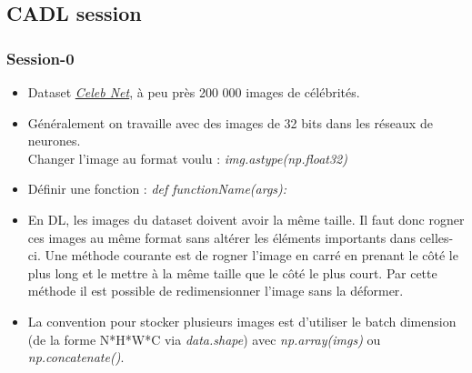 \documentclass[12pt,a4paper]{article}
\begin{document}
\subsection{CADL session}
\subsubsection{Session-0}
\begin{itemize}
\item Dataset \href{http://mmlab.ie.cuhk.edu.hk/projects/CelebA.html}{\textit{Celeb Net}}, à peu près 200 000 images de célébrités.
\item Généralement on travaille avec des images de 32 bits dans les réseaux de neurones.\\
Changer l'image au format voulu : \textit{img.astype(np.float32)}
\item Définir une fonction : \textit{def functionName(args):}
\item En DL, les images du dataset doivent avoir la même taille. Il faut donc rogner ces images au même format sans altérer les éléments importants dans celles-ci. Une méthode courante est de rogner l'image en carré en prenant le côté le plus long et le mettre à la même taille que le côté le plus court. Par cette méthode il est possible de redimensionner l'image sans la déformer.
\item La convention pour stocker plusieurs images est d'utiliser le batch dimension (de la forme N*H*W*C via \textit{data.shape}) avec \textit{np.array(imgs)} ou \textit{np.concatenate()}. 
\end{itemize}
\end{document}
